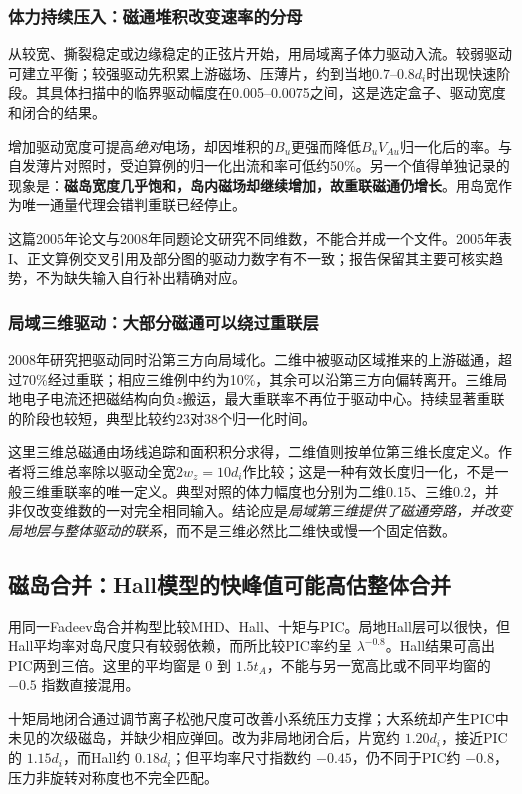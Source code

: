 \documentclass[UTF8,a4paper,11pt,openany,fontset=fandol]{ctexbook}
\begin{document}
\subsubsection{体力持续压入：磁通堆积改变速率的分母}
\citet{L076}从较宽、撕裂稳定或边缘稳定的正弦片开始，用局域离子体力驱动入流。较弱驱动可建立平衡；较强驱动先积累上游磁场、压薄片，约到当地$0.7$--$0.8d_i$时出现快速阶段。其具体扫描中的临界驱动幅度在0.005--0.0075之间，这是选定盒子、驱动宽度和闭合的结果。

增加驱动宽度可提高\emph{绝对}电场，却因堆积的$B_u$更强而降低$B_uV_{Au}$归一化后的率。与自发薄片对照时，受迫算例的归一化出流和率可低约50\%。另一个值得单独记录的现象是：\textbf{磁岛宽度几乎饱和，岛内磁场却继续增加，故重联磁通仍增长}。用岛宽作为唯一通量代理会错判重联已经停止。

这篇2005年论文与2008年同题论文研究不同维数，不能合并成一个文件。2005年表I、正文算例交叉引用及部分图的驱动力数字有不一致；报告保留其主要可核实趋势，不为缺失输入自行补出精确对应。

\subsubsection{局域三维驱动：大部分磁通可以绕过重联层}
2008年研究把驱动同时沿第三方向局域化。二维中被驱动区域推来的上游磁通，超过70\%经过重联；相应三维例中约为10\%，其余可以沿第三方向偏转离开。三维局地电子电流还把磁结构向负$z$搬运，最大重联率不再位于驱动中心。持续显著重联的阶段也较短，典型比较约23对38个归一化时间。\citep{F717}

这里三维总磁通由场线追踪和面积积分求得，二维值则按单位第三维长度定义。作者将三维总率除以驱动全宽$2w_z=10d_i$作比较；这是一种有效长度归一化，不是一般三维重联率的唯一定义。典型对照的体力幅度也分别为二维0.15、三维0.2，并非仅改变维数的一对完全相同输入。结论应是\emph{局域第三维提供了磁通旁路，并改变局地层与整体驱动的联系}，而不是三维必然比二维快或慢一个固定倍数。

\subsection{磁岛合并：Hall模型的快峰值可能高估整体合并}
\citet{Ng2015}用同一Fadeev岛合并构型比较MHD、Hall、十矩与PIC。局地Hall层可以很快，但Hall平均率对岛尺度只有较弱依赖，而所比较PIC率约呈 $\lambda^{-0.8}$。Hall结果可高出PIC两到三倍。这里的平均窗是 $0$ 到 $1.5t_A$，不能与另一宽高比或不同平均窗的 $-0.5$ 指数直接混用。

十矩局地闭合通过调节离子松弛尺度可改善小系统压力支撑；大系统却产生PIC中未见的次级磁岛，并缺少相应弹回。\citet{Ng2017}改为非局地闭合后，片宽约 $1.20d_i$，接近PIC的 $1.15d_i$，而Hall约 $0.18d_i$；但平均率尺寸指数约 $-0.45$，仍不同于PIC约 $-0.8$，压力非旋转对称度也不完全匹配。
\end{document}
